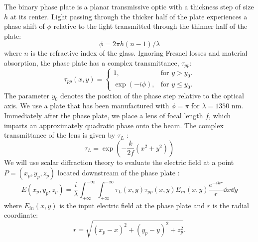 The binary phase plate is a planar transmissive optic with a thickness step of size $h$ at its center. Light passing through the thicker half of the plate experiences a phase shift of $\phi$ relative to the light transmitted through the thinner half of the plate:
\begin{equation}
\phi = 2 \pi h (n-1)/\lambda
\end{equation}
where $n$ is the refractive index of the glass. Ignoring Fresnel losses and material absorption, the phase plate has a complex transmittance, $\tau_{pp}$:
\begin{equation}
\tau_{pp} (x, y) =  \begin{cases}
1, & \textrm{for $y > y_0$}.\\
\exp (-i \phi), & \textrm{for $y \le y_0$}.
\end{cases}
\label{eqn:phase-plate-transmission}
\end{equation}
The parameter $y_0$ denotes the position of the phase step relative to the optical axis. We use a plate that has been manufactured with $\phi=\pi$ for $\lambda = 1350 \textrm{ nm}$. Immediately after the phase plate, we place a lens of focal length $f$, which imparts an approximately quadratic phase onto the beam. The complex transmittance of the lens is given by $\tau_L$ \cite{goodmanIntroductionFourierOptics1996}:
\begin{equation}
\tau_L = \exp \left( - \frac{k}{2 f} (x^2 + y^2) \right)
\label{eqn:complex_transmittance_lens}
\end{equation}
We will use scalar diffraction theory to evaluate the electric field at a point $P=(x_p, y_p, z_p)$ located downstream of the phase plate \cite{passillySimpleInterferometricTechnique2005}:
\begin{equation}
E(x_p, y_p, z_p) = \frac{i}{\lambda} \int_{+ \infty}^{- \infty} \int_{+ \infty}^{- \infty} \tau_{L} (x,y) \tau_{pp} (x,y) E_{in} (x,y) \frac{e^{-i k r}}{r} \dd{x} \dd{y}
\label{eqn:diffraction_integral}
\end{equation}
where $E_{in}(x,y)$ is the input electric field at the phase plate and $r$ is the radial coordinate:
$$
r = \sqrt{(x_p-x)^2 + (y_p-y)^2 + z_p^2}.
$$

